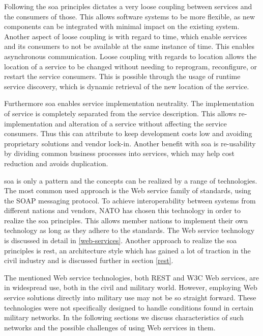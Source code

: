Following the \gls{soa} principles dictates a very loose coupling between
services and the consumers of those. This allows software systems to be more
flexible, as new components can be integrated with minimal impact on the
existing system. Another aspect of loose coupling is with regard to time, which
enable services and its consumers to not be available at the same instance of
time. This enables asynchronous communication. Loose coupling with regards to
location allows the location of a service to be changed without needing to
reprogram, reconfigure, or restart the service consumers. This is possible
through the usage of runtime service discovery, which is dynamic retrieval of
the new location of the service.

Furthermore \gls{soa} enables service implementation neutrality. The
implementation of service is completely separated from the service
description. This allows re-implementation and alteration of a service without
affecting the service consumers. Thus this can attribute to keep development
costs low and avoiding proprietary solutions and vendor lock-in. Another
benefit with \gls{soa} is re-usability by dividing common business processes
into services, which may help cost reduction and avoids duplication.

\gls{soa} is only a pattern and the concepts can be realized by a range of
technologies. The most common used approach is the Web service family of
standards, using the SOAP messaging protocol. To achieve interoperability
between systems from different nations and vendors, NATO has chosen this
technology in order to realize the \gls{soa} principles\cite{soa-baseline}. This
allows member nations to implement their own technology as long as they adhere
to the standards. The Web service technology is discussed in detail in
\cref{web-services}. Another approach to realize the \gls{soa} principles is
\gls{rest}, an architecture style which has gained a lot of traction in the
civil industry and is discussed further in section \cref{rest}.

The mentioned Web service technologies, both REST and W3C Web services, are in
widespread use, both in the civil and military world. However, employing Web
service solutions directly into military use may not be so straight forward.
These technologies were not specifically designed to handle conditions found in
certain military networks. In the following sections we discuss characteristics
of such networks and the possible challenges of using Web services in them.


